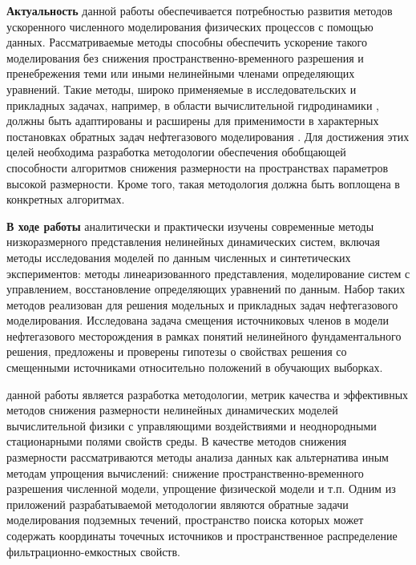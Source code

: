 
{\actuality}
\textbf{Актуальность} данной работы обеспечивается потребностью развития методов ускоренного численного моделирования физических процессов с помощью данных.
Рассматриваемые методы способны обеспечить ускорение такого моделирования без снижения пространственно-временного разрешения и пренебрежения теми или иными нелинейными членами определяющих уравнений.
Такие методы, широко применяемые в исследовательских и прикладных задачах, например, в области вычислительной гидродинамики \todo{\cite{}}, должны быть адаптированы и расширены для применимости в характерных постановках обратных задач нефтегазового моделирования .
Для достижения этих целей необходима разработка методологии обеспечения обобщающей способности алгоритмов снижения размерности на пространствах параметров высокой размерности.
Кроме того, такая методология должна быть воплощена в конкретных алгоритмах.

{\progress}
\textbf{В ходе работы} аналитически и практически изучены современные методы низкоразмерного представления нелинейных динамических систем, включая методы исследования моделей по данным численных и синтетических экспериментов: методы линеаризованного представления, моделирование систем с управлением, восстановление определяющих уравнений по данным. Набор таких методов реализован для решения модельных и прикладных задач нефтегазового моделирования. Исследована задача смещения источниковых членов в модели нефтегазового месторождения в рамках понятий нелинейного фундаментального решения, предложены и проверены гипотезы о свойствах решения со смещенными источниками относительно положений в обучающих выборках.

{\aim} данной работы является разработка методологии, метрик качества и эффективных методов снижения размерности нелинейных динамических моделей вычислительной физики с управляющими воздействиями и неоднородными стационарными полями свойств среды.
В качестве методов снижения размерности рассматриваются методы анализа данных как альтернатива иным методам упрощения вычислений: снижение пространственно-временного разрешения численной модели, упрощение физической модели и т.п.
Одним из приложений разрабатываемой методологии являются обратные задачи моделирования подземных течений, пространство поиска которых может содержать координаты точечных источников и пространственное распределение фильтрационно-емкостных свойств.

